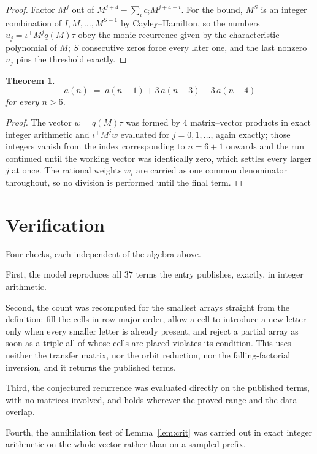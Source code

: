 \documentclass[11pt,a4paper]{article}
\theoremstyle{plain}
\newtheorem{theorem}{Theorem}
\theoremstyle{definition}
\begin{document}
\begin{proof}
Factor $M^{j}$ out of $M^{j+4}-\sum_ic_iM^{j+4-i}$. For the bound, $M^{S}$
is an integer combination of $I,M,\dots,M^{S-1}$ by Cayley--Hamilton, so the numbers
$u_j=\iota^{\!\top}M^{j}q(M)\tau$ obey the monic recurrence given by the characteristic
polynomial of $M$; $S$ consecutive zeros force every later one, and the last nonzero $u_j$
pins the threshold exactly.
\end{proof}

\begin{theorem}
\[
a(n)\;=\;a(n-1) + 3\,a(n-3) - 3\,a(n-4)
\]
for every $n>6$.
\end{theorem}

\begin{proof}
The vector $w=q(M)\tau$ was formed by $4$ matrix--vector products in exact integer
arithmetic and $\iota^{\!\top}M^{j}w$ evaluated for $j=0,1,\dots$, again exactly; those
integers vanish from the index corresponding to $n=6+1$ onwards and the run continued
until the working vector was identically zero, which settles every larger $j$ at once. The
rational weights $w_i$ are carried as one common denominator throughout, so no division is
performed until the final term.
\end{proof}

\section{Verification}

Four checks, each independent of the algebra above.

First, the model reproduces all $37$ terms the entry publishes, exactly, in integer
arithmetic.

Second, the count was recomputed for the smallest arrays straight from the definition: fill the
cells in row major order, allow a cell to introduce a new letter only when every smaller letter
is already present, and reject a partial array as soon as a triple all of whose cells are
placed violates its condition. This uses neither the transfer matrix, nor the orbit reduction,
nor the falling-factorial inversion, and it returns the published terms.

Third, the conjectured recurrence was evaluated directly on the published terms, with no
matrices involved, and holds wherever the proved range and the data overlap.

Fourth, the annihilation test of Lemma~\ref{lem:crit} was carried out in exact integer
arithmetic on the whole vector rather than on a sampled prefix.
\end{document}
